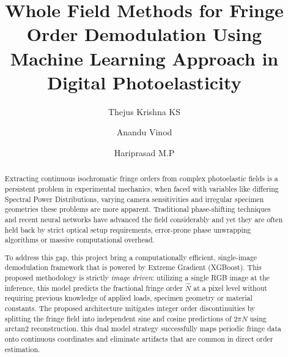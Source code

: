 \documentclass[review,12pt]{elsarticle}
\begin{document}
\begin{frontmatter}

\title{Whole Field Methods for Fringe Order Demodulation Using Machine Learning Approach in Digital Photoelasticity}

\author[inst1]{Thejus Krishna KS}
\author[inst1]{Anandu Vinod}
\author[inst2]{Hariprasad M.P}




\begin{abstract}

Extracting continuous isochromatic fringe orders from complex photoelastic fields is a persistent problem in experimental mechanics, when faced with variables like differing Spectral Power Distributions, varying camera sensitivities and irregular specimen geometries these problems are more apparent. Traditional phase-shifting techniques and recent neural networks have advanced the field considerably and yet they are often held back by strict optical setup requirements, error-prone phase unwrapping algorithms or massive computational overhead. 

To address this gap, this project bring a computationally efficient, single-image demodulation framework that is powered by Extreme Gradient (XGBoost). This proposed methodology is strictly \emph{image driven}: utilizing a single RGB image at the inference, this model predicts the fractional fringe order $\hat{N}$  at a pixel level without requiring previous knowledge of applied loads, specimen geometry or material constants. The proposed architecture mitigates integer order discontinuities by splitting the fringe field into independent sine and cosine predictions of $2\pi N$ using $\mathrm{arctan2}$ reconstruction. this dual model strategy successfully maps periodic fringe data onto continuous coordinates  and eliminate artifacts that are common in direct order estimation.


\end{abstract}
\end{frontmatter}
\end{document}
